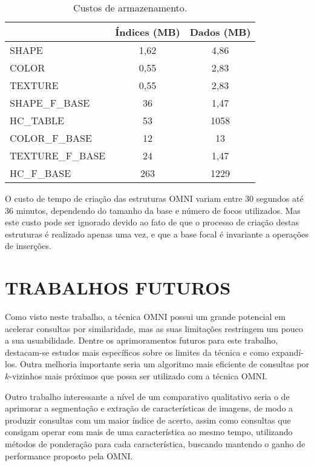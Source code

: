 \begin{table}[H]
    \centering
    \caption[Custos de armazenamento]{Custos de armazenamento.
    \label{tab:custos}}
   \begin{tabular}{l c c}
        \toprule
             &Índices (MB)& Dados (MB)\\
        \midrule
            SHAPE & 1,62& 4,86 \\
            COLOR & 0,55& 2,83 \\
            TEXTURE & 0,55& 2,83 \\
            SHAPE\_F\_BASE & 36& 1,47 \\
            HC\_TABLE & 53& 1058 \\
            COLOR\_F\_BASE & 12& 13 \\
            TEXTURE\_F\_BASE & 24& 1,47 \\
            HC\_F\_BASE & 263& 1229 \\
        \bottomrule
    \end{tabular}
\end{table}

O custo de tempo de criação das estruturas OMNI variam entre 30 segundos até 36 minutos, dependendo do tamanho da base e número de focos
utilizados. Mas este custo pode ser ignorado devido ao fato de que o processo de criação destas estruturas é realizado apenas uma vez,
e que a base focal é invariante a operações de inserções.

\section{TRABALHOS FUTUROS}
\label{sec:trabalhosFuturos}

Como visto neste trabalho, a técnica OMNI possui um grande potencial em acelerar consultas por similaridade, mas as suas limitações restringem um pouco a sua usuabilidade. Dentre os aprimoramentos futuros para este trabalho, destacam-se estudos mais específicos
sobre os limites da técnica e como expandí-los. Outra melhoria importante seria um algoritmo mais eficiente de consultas por $k$-vizinhos mais próximos que possa ser utilizado com a técnica OMNI.

Outro trabalho interessante a nível de um comparativo qualitativo seria o de aprimorar a segmentação e extração de características de imagens, de modo a produzir consultas com um maior índice de acerto, assim
como consultas que consigam operar com mais de uma característica ao mesmo tempo, utilizando métodos de ponderação para cada característica, buscando mantendo o ganho de performance proposto pela OMNI.

